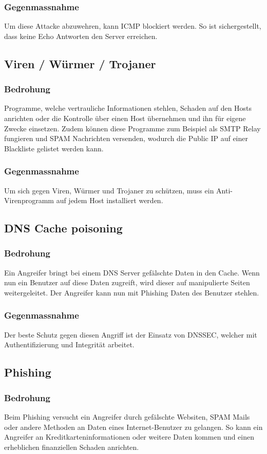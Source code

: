 \documentclass[11pt,a4paper,parskip=half]{scrartcl}
\begin{document}
\subsubsection{Gegenmassnahme}
Um diese Attacke abzuwehren, kann ICMP blockiert werden. So ist sichergestellt, dass keine Echo Antworten den Server erreichen.

\subsection{Viren / Würmer / Trojaner}
\subsubsection{Bedrohung}
Programme, welche vertrauliche Informationen stehlen, Schaden auf den Hosts anrichten oder die Kontrolle über einen Host übernehmen und ihn für eigene Zwecke einsetzen. Zudem können diese Programme zum Beispiel als SMTP Relay fungieren und SPAM Nachrichten versenden, wodurch die Public IP auf einer Blackliste gelistet werden kann.
\subsubsection{Gegenmassnahme}
Um sich gegen Viren, Würmer und Trojaner zu schützen, muss ein Anti-Virenprogramm auf jedem Host installiert werden.

\subsection{DNS Cache poisoning}
\subsubsection{Bedrohung}
Ein Angreifer bringt bei einem DNS Server gefälschte Daten in den Cache. Wenn nun ein Benutzer auf diese Daten zugreift, wird dieser auf manipulierte Seiten weitergeleitet. Der Angreifer kann nun mit Phishing Daten des Benutzer stehlen.

\subsubsection{Gegenmassnahme}
Der beste Schutz gegen diesen Angriff ist der Einsatz von DNSSEC, welcher mit Authentifizierung und Integrität arbeitet.
\subsection{Phishing}
\subsubsection{Bedrohung}
Beim Phishing versucht ein Angreifer durch gefälschte Websiten, SPAM Mails oder andere Methoden an Daten eines Internet-Benutzer zu gelangen. So kann ein Angreifer an Kreditkarteninformationen oder weitere Daten kommen und einen erheblichen finanziellen Schaden anrichten.
\end{document}
